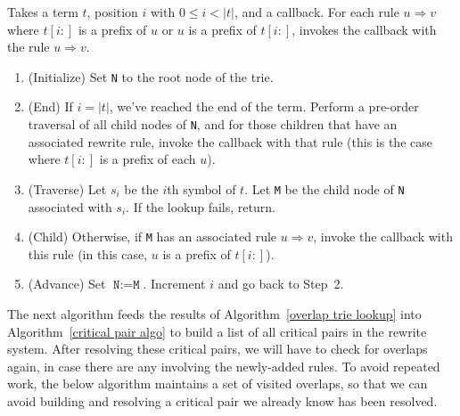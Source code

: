 \documentclass[../generics]{subfiles}
\begin{document}
\begin{algorithm}\label{overlap trie lookup}
Takes a term $t$, position $i$ with $0\leq i<|t|$, and a callback. For each rule $u\Rightarrow v$ where $t[i:]$ is a prefix of $u$ or $u$ is a prefix of $t[i:]$, invokes the callback with the rule $u\Rightarrow v$.
\begin{enumerate}
\item (Initialize) Set \texttt{N} to the root node of the trie.
\item (End) If $i=|t|$, we've reached the end of the term. Perform a pre-order traversal of all child nodes of \texttt{N}, and for those children that have an associated rewrite rule, invoke the callback with that rule (this is the case where $t[i:]$ is a prefix of each $u$).
\item (Traverse) Let $s_i$ be the $i$th symbol of $t$. Let \texttt{M} be the child node of \texttt{N} associated with $s_i$. If the lookup fails, return.
\item (Child) Otherwise, if \texttt{M} has an associated rule $u\Rightarrow v$, invoke the callback with this rule (in this case, $u$ is a prefix of $t[i:]$).
\item (Advance) Set $\texttt{N}:=\texttt{M}$. Increment $i$ and go back to Step~2.
\end{enumerate}
\end{algorithm}

The next algorithm feeds the results of Algorithm~\ref{overlap trie lookup} into Algorithm~\ref{critical pair algo} to build a list of all critical pairs in the rewrite system. After resolving these critical pairs, we will have to check for overlaps again, in case there are any involving the newly-added rules. To avoid repeated work,  the below algorithm maintains a set of visited overlaps, so that we can avoid building and resolving a critical pair we already know has been resolved.
\end{document}
